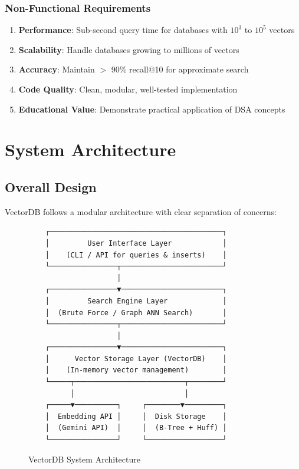 \documentclass[12pt,a4paper]{article}
\begin{document}
\subsubsection{Non-Functional Requirements}
\begin{enumerate}
    \item \textbf{Performance}: Sub-second query time for databases with $10^3$ to $10^5$ vectors
    \item \textbf{Scalability}: Handle databases growing to millions of vectors
    \item \textbf{Accuracy}: Maintain $>$ 90\% recall@10 for approximate search
    \item \textbf{Code Quality}: Clean, modular, well-tested implementation
    \item \textbf{Educational Value}: Demonstrate practical application of DSA concepts
\end{enumerate}

\section{System Architecture}

\subsection{Overall Design}
VectorDB follows a modular architecture with clear separation of concerns:

\begin{figure}[h]
    \centering
    \begin{verbatim}
    ┌─────────────────────────────────────────┐
    │         User Interface Layer            │
    │    (CLI / API for queries & inserts)    │
    └────────────────┬────────────────────────┘
                     │
    ┌────────────────▼────────────────────────┐
    │         Search Engine Layer             │
    │  (Brute Force / Graph ANN Search)       │
    └────────────────┬────────────────────────┘
                     │
    ┌────────────────▼────────────────────────┐
    │      Vector Storage Layer (VectorDB)    │
    │    (In-memory vector management)        │
    └─────┬──────────────────────────┬────────┘
          │                          │
    ┌─────▼──────────┐     ┌────────▼─────────┐
    │  Embedding API │     │  Disk Storage    │
    │  (Gemini API)  │     │  (B-Tree + Huff) │
    └────────────────┘     └──────────────────┘
    \end{verbatim}
    \caption{VectorDB System Architecture}
\end{figure}
\end{document}
